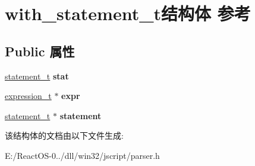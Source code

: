 \hypertarget{structwith__statement__t}{}\section{with\+\_\+statement\+\_\+t结构体 参考}
\label{structwith__statement__t}
\subsection*{Public 属性}
\begin{DoxyCompactItemize}
\item 
\mbox{\label{structwith__statement__t_adc39fdbfbce58fd8c40c7f5b1e42836e}} 
\hyperlink{struct__statement__t}{statement\+\_\+t} {\bfseries stat}
\item 
\mbox{\label{structwith__statement__t_a36549f3e71e126bb8ff205f6191c1045}} 
\hyperlink{struct__expression__t}{expression\+\_\+t} $\ast$ {\bfseries expr}
\item 
\mbox{\label{structwith__statement__t_aea68745a8ae8fd05004b6e5067d14d57}} 
\hyperlink{struct__statement__t}{statement\+\_\+t} $\ast$ {\bfseries statement}
\end{DoxyCompactItemize}


该结构体的文档由以下文件生成\+:\begin{DoxyCompactItemize}
\item 
E\+:/\+React\+O\+S-\/0../dll/win32/jscript/parser.\+h\end{DoxyCompactItemize}
